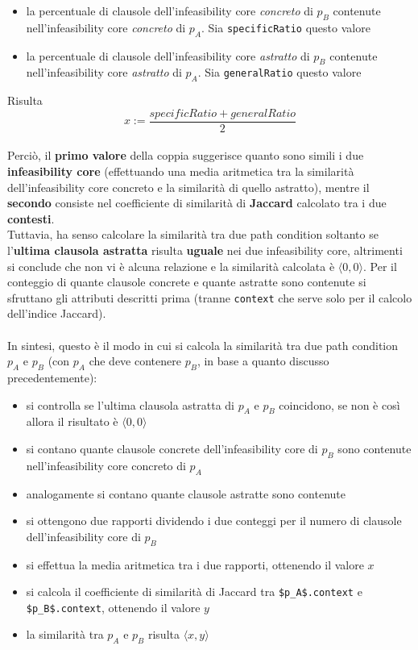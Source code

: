 \documentclass[a4paper, 12pt, oneside]{book}
\theoremstyle{normal}
\begin{document}
\begin{itemize}[label=$\bullet$, itemsep=0pt, topsep=2pt]
    \item la percentuale di clausole dell'infeasibility core \emph{concreto} di $p_B$ contenute nell'infeasibility core \emph{concreto} di $p_A$. Sia \verb|specificRatio| questo valore
    \item la percentuale di clausole dell'infeasibility core \emph{astratto} di $p_B$ contenute nell'infeasibility core \emph{astratto} di $p_A$. Sia \verb|generalRatio| questo valore
\end{itemize}
Risulta \[x := \dfrac{specificRatio + generalRatio}{2}\]
\\ Perciò, il \textbf{primo valore} della coppia suggerisce quanto sono simili i due \textbf{infeasibility core} (effettuando una media aritmetica tra la similarità dell'infeasibility core concreto e la similarità di quello astratto), mentre il \textbf{secondo} consiste nel coefficiente di similarità di \textbf{Jaccard} calcolato tra i due \textbf{contesti}.
\\ Tuttavia, ha senso calcolare la similarità tra due path condition soltanto se l'\textbf{ultima clausola astratta} risulta \textbf{uguale} nei due infeasibility core, altrimenti si conclude che non vi è alcuna relazione e la similarità calcolata è $\langle 0, 0 \rangle$. Per il conteggio di quante clausole concrete e quante astratte sono contenute si sfruttano gli attributi descritti prima (tranne \verb|context| che serve solo per il calcolo dell'indice Jaccard).
\\ \\ In sintesi, questo è il modo in cui si calcola la similarità tra due path condition $p_A$ e $p_B$ (con $p_A$ che deve contenere $p_B$, in base a quanto discusso precedentemente):
\begin{itemize}[label={--}, itemsep=0pt, topsep=2pt]
    \item si controlla se l'ultima clausola astratta di $p_A$ e $p_B$ coincidono, se non è così allora il risultato è $\langle 0, 0 \rangle$
    \item si contano quante clausole concrete dell'infeasibility core di $p_B$ sono contenute nell'infeasibility core concreto di $p_A$
    \item analogamente si contano quante clausole astratte sono contenute
    \item si ottengono due rapporti dividendo i due conteggi per il numero di clausole dell'infeasibility core di $p_B$
    \item si effettua la media aritmetica tra i due rapporti, ottenendo il valore $x$
    \item si calcola il coefficiente di similarità di Jaccard tra \lstinline|$p_A$.context| e \lstinline|$p_B$.context|, ottenendo il valore $y$
    \item la similarità tra $p_A$ e $p_B$ risulta $\langle x, y \rangle$
\end{itemize}
\end{document}
